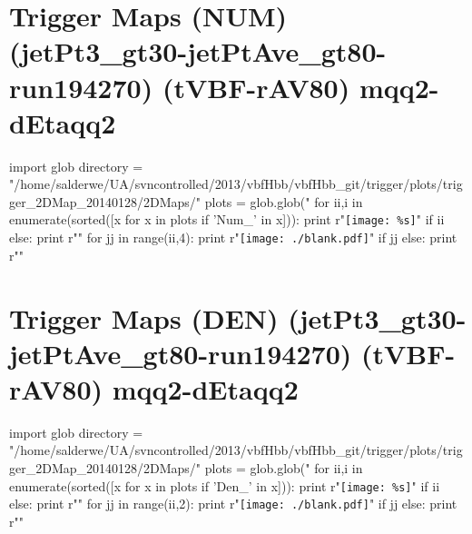 \documentclass[12pt,english,dvipsnames]{beamer}
\newcommand{\UAoverlay}[0]{%
\begin{tikzpicture}[remember picture,overlay,shift={(current page.north east)}]
\node (zero) at (-1.8cm,-0.93cm) {\texttt{[image: ../logos/CMS.pdf]}\hspace{0.15cm}\texttt{[image: ../logos/CERN.pdf]}\hspace{0.15cm}\texttt{[image: ../logos/UA.pdf]}}; 
\end{tikzpicture}
}
\begin{document}
\section{Trigger Maps (NUM) (jetPt3\_gt30-jetPtAve\_gt80-run194270) (tVBF-rAV80) mqq2-dEtaqq2}
\begin{frame}[t,fragile]%
\begin{python}
import glob
directory = "/home/salderwe/UA/svncontrolled/2013/vbfHbb/vbfHbb_git/trigger/plots/trigger_2DMap_20140128/2DMaps/"
plots = glob.glob("%
for ii,i in enumerate(sorted([x for x in plots if 'Num_' in x])):
  print r"\texttt{[image: \%s]}"%
  if ii%
  else: print r"\hfill"
for jj in range(ii,4):
  print r"\texttt{[image: ./blank.pdf]}"
  if jj%
  else: print r"\hfill"
\end{python} 
\end{frame}
\section{Trigger Maps (DEN) (jetPt3\_gt30-jetPtAve\_gt80-run194270) (tVBF-rAV80) mqq2-dEtaqq2}
\begin{frame}[t,fragile]%
\begin{python}
import glob
directory = "/home/salderwe/UA/svncontrolled/2013/vbfHbb/vbfHbb_git/trigger/plots/trigger_2DMap_20140128/2DMaps/"
plots = glob.glob("%
for ii,i in enumerate(sorted([x for x in plots if 'Den_' in x])):
  print r"\texttt{[image: \%s]}"%
  if ii%
  else: print r"\hfill"
for jj in range(ii,2):
  print r"\texttt{[image: ./blank.pdf]}"
  if jj%
  else: print r"\hfill"
\end{python} 
\end{frame}
\end{document}
